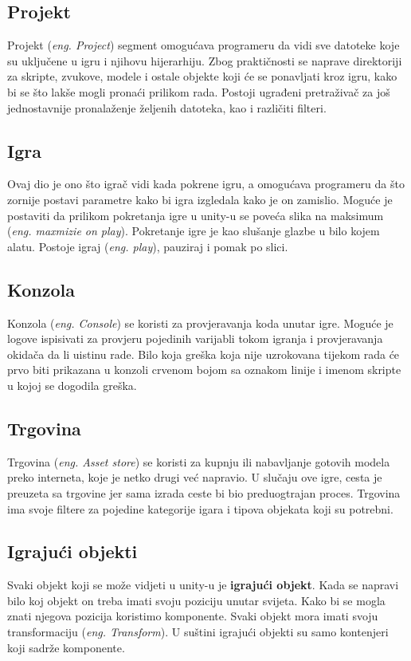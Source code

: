 \subsection{Projekt}
Projekt (\emph{eng. Project}) segment omogućava programeru da vidi sve datoteke koje su uključene u igru i njihovu hijerarhiju. Zbog praktičnosti se naprave direktoriji za skripte, zvukove, modele i ostale objekte koji će se ponavljati kroz igru, kako bi se što lakše mogli pronaći prilikom rada. Postoji ugrađeni pretraživač za još jednostavnije pronalaženje željenih datoteka, kao i različiti filteri.

\subsection{Igra}
Ovaj dio je ono što igrač vidi kada pokrene igru, a omogućava programeru da što zornije postavi parametre kako bi igra izgledala kako je on zamislio. Moguće je postaviti da prilikom pokretanja igre u unity-u se poveća slika na maksimum (\emph{eng. maxmizie on play}). Pokretanje igre je kao slušanje glazbe u bilo kojem alatu. Postoje igraj (\emph{eng. play}), pauziraj i pomak po slici.

\subsection{Konzola}
Konzola (\emph{eng. Console}) se koristi za provjeravanja koda unutar igre. Moguće je logove ispisivati za provjeru pojedinih varijabli tokom igranja i provjeravanja okidača da li uistinu rade. Bilo koja greška koja nije uzrokovana tijekom rada će prvo biti prikazana u konzoli crvenom bojom sa oznakom linije i imenom skripte u kojoj se dogodila greška.

\subsection{Trgovina}
Trgovina (\emph{eng. Asset store}) se koristi za kupnju ili nabavljanje gotovih modela preko interneta, koje je netko drugi već napravio. U slučaju ove igre, cesta je preuzeta sa trgovine jer sama izrada ceste bi bio preduogtrajan proces. Trgovina ima svoje filtere za pojedine kategorije igara i tipova objekata koji su potrebni.

\subsection{Igrajući objekti}
Svaki objekt koji se može vidjeti u unity-u je \textbf{igrajući objekt}. Kada se napravi bilo koj objekt on treba imati svoju poziciju unutar svijeta. Kako bi se mogla znati njegova pozicija koristimo komponente. Svaki objekt mora imati svoju transformaciju (\emph{eng. Transform}). U suštini igrajući objekti su samo kontenjeri koji sadrže komponente.

